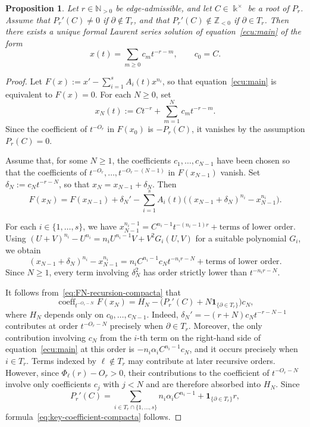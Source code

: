 \documentclass[12pt,a4paper]{amsart}
\numberwithin{theorem}{section}
\newtheorem{proposition}[theorem]{Proposition}
\theoremstyle{definition}
\begin{document}
	\begin{proposition}\label{prop:existence}
		Let $r\in\mathbb{N}_{>0}$ be edge-admissible, and let $C\in\Bbbk^\times$ be a root of $P_r$. Assume that $P_r'(C)\neq0$ if $\partial\notin T_r$, and that $P_r'(C)\notin\mathbb{Z}_{<0}$ if $\partial\in T_r$. Then there exists a unique formal Laurent series solution of equation~\eqref{ecu:main} of the form
		\[
		x(t)=\sum_{m\geq0}c_mt^{-r-m},\qquad c_0=C.
		\]
	\end{proposition}
	
	\begin{proof}
		Let $F(x):=x'-\sum_{i=1}^sA_i(t)x^{n_i}$, so that equation~\eqref{ecu:main} is equivalent to $F(x)=0$. For each $N\geq0$, set
		\[
		x_N(t):=Ct^{-r}+\sum_{m=1}^N c_mt^{-r-m}.
		\]
		Since the coefficient of $t^{-O_r}$ in $F(x_0)$ is $-P_r(C)$, it vanishes by the assumption $P_r(C)=0$.
		
		Assume that, for some $N\geq1$, the coefficients $c_1,\ldots,c_{N-1}$ have been chosen so that the coefficients of $t^{-O_r},\ldots,t^{-O_r-(N-1)}$ in $F(x_{N-1})$ vanish. Set $\delta_N:=c_Nt^{-r-N}$, so that $x_N=x_{N-1}+\delta_N$. Then
		\begin{equation}\label{eq:FN-recursion-compacta}
			F(x_N)=F(x_{N-1})+\delta_N'-\sum_{i=1}^sA_i(t)\bigl((x_{N-1}+\delta_N)^{n_i}-x_{N-1}^{n_i}\bigr).
		\end{equation}
		
		For each $i\in\{1,\ldots,s\}$, we have $x_{N-1}^{n_i-1}=C^{n_i-1}t^{-(n_i-1)r}+\text{terms of lower order}$. Using $(U+V)^{n_i}-U^{n_i}=n_iU^{n_i-1}V+V^2G_i(U,V)$ for a suitable polynomial $G_i$, we obtain
		\[
		(x_{N-1}+\delta_N)^{n_i}-x_{N-1}^{n_i}=n_iC^{n_i-1}c_Nt^{-n_ir-N}+\text{terms of lower order}.
		\]
		Since $N\geq1$, every term involving $\delta_N^2$ has order strictly lower than $t^{-n_ir-N}$.
		
		It follows from~\eqref{eq:FN-recursion-compacta} that
		\begin{equation}\label{eq:key-coefficient-compacta}
			\operatorname{coeff}_{t^{-O_r-N}}F(x_N)=H_N-\bigl(P_r'(C)+N\mathbf{1}_{\{\partial\in T_r\}}\bigr)c_N,
		\end{equation}
		where $H_N$ depends only on $c_0,\ldots,c_{N-1}$. Indeed, $\delta_N'=-(r+N)c_Nt^{-r-N-1}$ contributes at order $t^{-O_r-N}$ precisely when $\partial\in T_r$. Moreover, the only contribution involving $c_N$ from the $i$-th term on the right-hand side of equation~\eqref{ecu:main} at this order is $-n_i\alpha_iC^{n_i-1}c_N$, and it occurs precisely when $i\in T_r$. Terms indexed by $\ell\notin T_r$ may contribute at later recursive orders. However, since $\Phi_\ell(r)-O_r>0$, their contributions to the coefficient of $t^{-O_r-N}$ involve only coefficients $c_j$ with $j<N$ and are therefore absorbed into $H_N$. Since
		\[
		P_r'(C)=\sum_{i\in T_r\cap\{1,\ldots,s\}}n_i\alpha_iC^{n_i-1}+\mathbf{1}_{\{\partial\in T_r\}}r,
		\]
		formula~\eqref{eq:key-coefficient-compacta} follows.
		

\end{proof}
\end{document}
